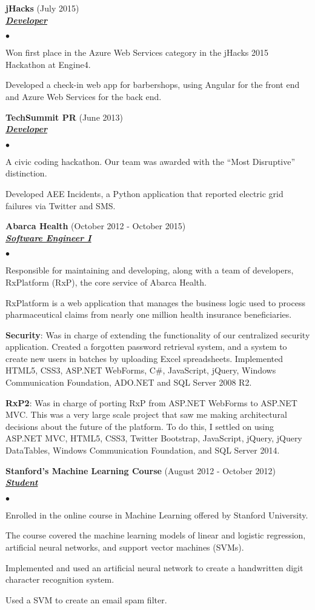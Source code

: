 \documentclass{article}
\newcommand{\employer}[3]{{ \textbf{#1} (#2)\\ \underline{\textbf{\emph{#3}}}\\  }}
\newenvironment{achievements}{\begin{list}{$\bullet$}{\topsep 0pt \itemsep -2pt}}{\vspace*{4pt}\end{list}}
\begin{document}
\employer{jHacks}{July 2015}{Developer}
	\begin{achievements}
	\item Won first place in the Azure Web Services category in the jHacks 2015 Hackathon at Engine4.
	\item Developed a check-in web app for barbershops, using Angular for the front end and Azure Web Services for the back end.
	\end{achievements}

\employer{TechSummit PR}{June 2013}{Developer}
	\begin{achievements}
	\item A civic coding hackathon. Our team was awarded with the ``Most Disruptive'' distinction.
	\item Developed AEE Incidents, a Python application that reported electric grid failures via Twitter and SMS.
	\end{achievements}

\employer{Abarca Health}{October 2012 - October 2015}{Software Engineer I}
	\begin{achievements}
	\item Responsible for maintaining and developing, along with a team of developers, RxPlatform (RxP), the core service of Abarca Health.
	\item RxPlatform is a web application that manages the business logic used to process pharmaceutical claims from nearly one million health insurance beneficiaries.
	\item \textbf{Security}: Was in charge of extending the functionality of our centralized security application. Created a forgotten password retrieval system, and a system to create new users in batches by uploading Excel spreadsheets. Implemented HTML5, CSS3, ASP.NET WebForms, C\string#, JavaScript, jQuery, Windows Communication Foundation, ADO.NET and SQL Server 2008 R2.
	\item \textbf{RxP2}: Was in charge of porting RxP from ASP.NET WebForms to ASP.NET MVC. This was a very large scale project that saw me making architectural decisions about the future of the platform. To do this, I settled on using ASP.NET MVC, HTML5, CSS3, Twitter Bootstrap, JavaScript, jQuery, jQuery DataTables, Windows Communication Foundation, and SQL Server 2014.
	\end{achievements}

\employer{Stanford's Machine Learning Course}{August 2012 - October 2012}{Student}
	\begin{achievements}
	\item Enrolled in the online course in Machine Learning offered by Stanford University.
	\item The course covered the machine learning models of linear and logistic regression, artificial neural networks, and support vector machines (SVMs).
	\item Implemented and used an artificial neural network to create a handwritten digit character recognition system.
	\item Used a SVM to create an email spam filter.   	
	\end{achievements}
\end{document}
